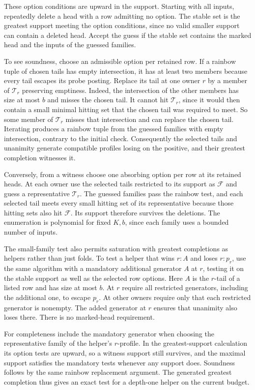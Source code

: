 These option conditions are upward in the support.
Starting with all inputs, repeatedly delete a
head with a row admitting no option. The stable
set is the greatest support meeting the option
conditions, since no valid smaller support can
contain a deleted head. Accept the guess if the
stable set contains the marked head and the
inputs of the guessed families.

To see soundness, choose an admissible option
per retained row. If a rainbow tuple of chosen
tails has empty intersection, it has at least
two members because every tail escapes its probe
posting. Replace its tail at one owner $r$ by
a member of $\mathcal T_r$ preserving emptiness.
Indeed, the intersection of the other members
has size at most $b$ and misses the chosen tail.
It cannot hit $\mathcal T_r$, since it would
then contain a small minimal hitting set that
the chosen tail was required to meet. So some
member of $\mathcal T_r$ misses that intersection
and can replace the chosen tail. Iterating
produces a rainbow tuple from the guessed
families with empty intersection, contrary to
the initial check. Consequently the selected
tails and unanimity generate compatible
profiles losing on the positive, and their
greatest completion witnesses it.

Conversely, from a witness choose one absorbing
option per row at its retained heads. At each
owner use the selected tails restricted to
its support as $\mathcal F$ and guess a
representative $\mathcal T_r$. The guessed
families pass the rainbow test, and each
selected tail meets every small hitting set
of its representative because those hitting
sets also hit $\mathcal F$. Its support
therefore survives the deletions. The enumeration
is polynomial for fixed $K,b$, since each family
uses a bounded number of inputs.

The small-family test also permits saturation with
greatest completions as helpers rather than just
folds. To test a helper that wins $r:A$ and loses
$r:p_r$, use the same algorithm with a mandatory
additional generator $A$ at $r$, testing it on the
stable support as well as the selected row options.
Here $A$ is the $r$-tail of a listed row and has
size at most $b$. At $r$ require all restricted
generators, including the additional one, to escape
$p_r$. At other owners require only that each
restricted generator is nonempty.
The added generator at $r$ ensures that unanimity
also loses there. There is no marked-head requirement.

For completeness include the mandatory generator
when choosing the representative family of the
helper's $r$-profile. In the greatest-support
calculation its option tests are upward, so a
witness support still survives, and the maximal
support satisfies the mandatory tests whenever
any support does. Soundness follows by the same
rainbow replacement argument. The generated
greatest completion thus gives an exact test for
a depth-one helper on the current budget.

